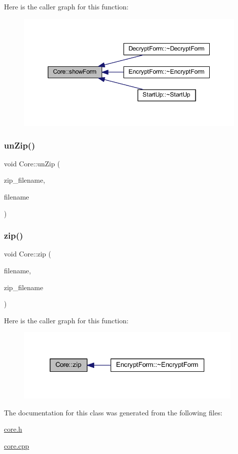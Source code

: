 Here is the caller graph for this function\+:
\nopagebreak
\begin{figure}[H]
\begin{center}
\leavevmode
\includegraphics[width=345pt]{class_core_ad3503f8f37ca8f8f31bbdefb273a9f78_icgraph}
\end{center}
\end{figure}
\hypertarget{class_core_a76ef88295ccbf20180de6273a2d387bc}{}\label{class_core_a76ef88295ccbf20180de6273a2d387bc} 
\subsubsection{\texorpdfstring{un\+Zip()}{unZip()}}
{\footnotesize\ttfamily void Core\+::un\+Zip (\begin{DoxyParamCaption}\item[{Q\+String}]{zip\+\_\+filename,  }\item[{Q\+String}]{filename }\end{DoxyParamCaption})}

\hypertarget{class_core_aa48d61e2fd30740e21ff228b8ee54dc1}{}\label{class_core_aa48d61e2fd30740e21ff228b8ee54dc1} 
\subsubsection{\texorpdfstring{zip()}{zip()}}
{\footnotesize\ttfamily void Core\+::zip (\begin{DoxyParamCaption}\item[{Q\+String}]{filename,  }\item[{Q\+String}]{zip\+\_\+filename }\end{DoxyParamCaption})}

Here is the caller graph for this function\+:
\nopagebreak
\begin{figure}[H]
\begin{center}
\leavevmode
\includegraphics[width=313pt]{class_core_aa48d61e2fd30740e21ff228b8ee54dc1_icgraph}
\end{center}
\end{figure}


The documentation for this class was generated from the following files\+:\begin{DoxyCompactItemize}
\item 
\hyperlink{core_8h}{core.\+h}\item 
\hyperlink{core_8cpp}{core.\+cpp}\end{DoxyCompactItemize}
